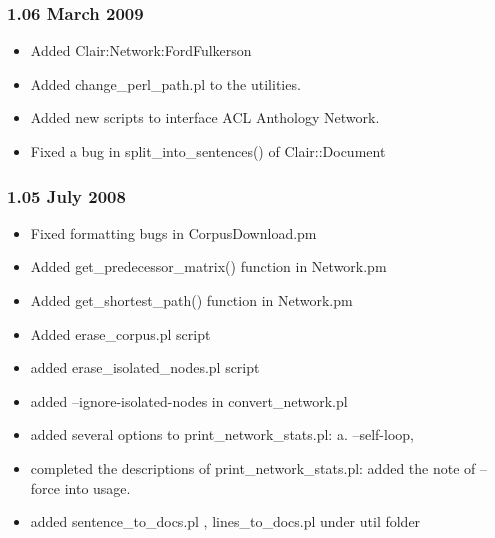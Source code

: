 \subsubsection*{1.06 March 2009\label{1_06_March_2009}}
\begin{itemize}

\item 

Added Clair:Network:FordFulkerson


\item 

Added change\_perl\_path.pl  to the utilities.


\item 

Added new scripts to interface ACL Anthology Network.


\item 

Fixed a bug in split\_into\_sentences() of Clair::Document

\end{itemize}
\subsubsection*{1.05 July 2008\label{1_05_July_2008}}
\begin{itemize}

\item 

Fixed formatting bugs in CorpusDownload.pm


\item 

Added get\_predecessor\_matrix() function in Network.pm


\item 

Added get\_shortest\_path() function in Network.pm


\item 

Added  erase\_corpus.pl script


\item added erase\_isolated\_nodes.pl script
\item added --ignore-isolated-nodes in convert\_network.pl
\item added several options to print\_network\_stats.pl: a. --self-loop,
\item completed the descriptions of print\_network\_stats.pl: added the
note of --force into usage.
\item 

added sentence\_to\_docs.pl , lines\_to\_docs.pl under util folder

\end{itemize}

